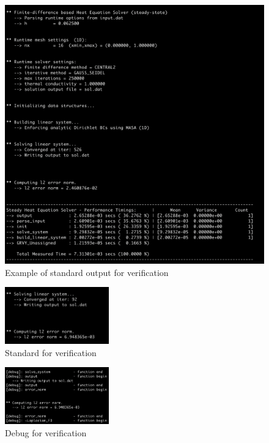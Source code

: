 \documentclass[a4paper]{article}
\begin{document}
\begin{figure}[htbp]
\centering
\includegraphics[width=1\textwidth]{example.png}
\caption{\label{eg}Example of standard output for verification}
\end{figure}

\begin{figure}[htbp]
\centering
\includegraphics[width=0.4\textwidth]{std_v.png}
\caption{\label{std_v}Standard for verification}
\end{figure}

\begin{figure}[htbp]
\centering
\includegraphics[width=0.4\textwidth]{debug_v.png}
\caption{\label{debug_v}Debug for verification}
\end{figure}
\end{document}
